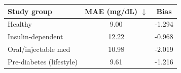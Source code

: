 \begin{tabular}{lcc}
\toprule
Study group & MAE (mg/dL) $\downarrow$ & Bias \\
\midrule
Healthy & 9.00 & -1.294 \\
Insulin-dependent & 12.22 & -0.968 \\
Oral/injectable med & 10.98 & -2.019 \\
Pre-diabetes (lifestyle) & 9.61 & -1.216 \\
\bottomrule
\end{tabular}
